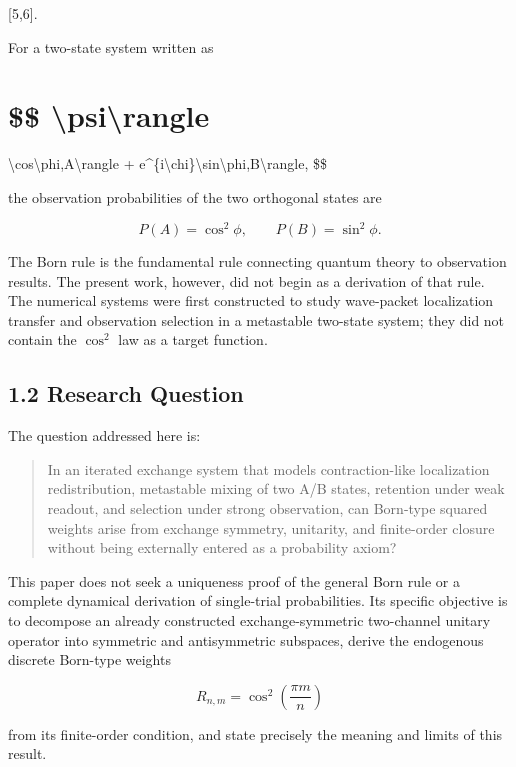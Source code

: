\documentclass[
  a4paper,
  10pt]{article}
\begin{document}
{[}5,6{]}.

For a two-state system written as

\section{\$\$
\textbar\textbackslash psi\textbackslash rangle}\label{-psirangle}

\textbackslash cos\textbackslash phi,\textbar A\textbackslash rangle +
e\^{}\{i\textbackslash chi\}\textbackslash sin\textbackslash phi,\textbar B\textbackslash rangle,
\$\$

the observation probabilities of the two orthogonal states are

\[
P(A)=\cos^2\phi,
\qquad
P(B)=\sin^2\phi.
\]

The Born rule is the fundamental rule connecting quantum theory to
observation results. The present work, however, did not begin as a
derivation of that rule. The numerical systems were first constructed to
study wave-packet localization transfer and observation selection in a
metastable two-state system; they did not contain the \(\cos^2\) law as
a target function.

\subsection{1.2 Research Question}\label{12-research-question}

The question addressed here is:

\begin{quote}
In an iterated exchange system that models contraction-like localization
redistribution, metastable mixing of two A/B states, retention under
weak readout, and selection under strong observation, can Born-type
squared weights arise from exchange symmetry, unitarity, and
finite-order closure without being externally entered as a probability
axiom?
\end{quote}

This paper does not seek a uniqueness proof of the general Born rule or
a complete dynamical derivation of single-trial probabilities. Its
specific objective is to decompose an already constructed
exchange-symmetric two-channel unitary operator into symmetric and
antisymmetric subspaces, derive the endogenous discrete Born-type
weights

\[
R_{n,m}=\cos^2\left(\frac{\pi m}{n}\right)
\]

from its finite-order condition, and state precisely the meaning and
limits of this result.
\end{document}
